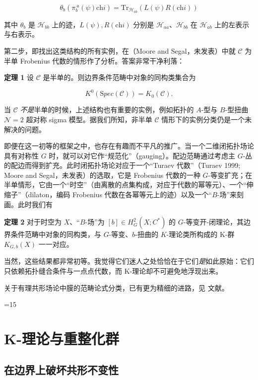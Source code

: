 \documentclass[11pt,a4paper]{ctexart}
\newcommand{\SrcRange}[2]{\ifnum#1=#2\marginpar{\raggedright\footnotesize 原文 p.#1}\else\marginpar{\raggedright\footnotesize 原文 pp.#1--#2}\fi}
\begin{document}
\[\theta_b(\pi_b^{~a}(\psi) \mathrm{ch}i) = {{\mathrm{Tr}}}_{{\mathcal H}_{ab}}\left( L(\psi) R(\mathrm{ch}i)\right)\]

其中 \(\theta_b\) 是 \({\mathcal H}_{bb}\) 上的迹，\(L(\psi),R(\mathrm{ch}i)\) 分别是 \({\mathcal H}_{aa}\)、\({\mathcal H}_{bb}\) 在 \({\mathcal H}_{ab}\) 上的左表示与右表示。

第二步，即找出这类结构的所有实例，在（Moore and Segal，未发表）中就 \({\mathcal C}\) 为半单 Frobenius 代数的情形作了分析。答案非常干净利落：

\textbf{定理 1} 设 \({\mathcal C}\) 是半单的。则边界条件范畴中对象的同构类集合为

\[K^0({\mathrm Spec}({\mathcal C}))= K_0({\mathcal C}) .\]

当 \({\mathcal C}\) \emph{不是}半单的时候，上述结构也有重要的实例，例如拓扑的 \(A\)-型与 \(B\)-型扭曲 \({\mathcal N}=2\) 超对称 sigma 模型。据我们所知，非半单 \({\mathcal C}\) 情形下的实例分类仍是一个未解决的问题。

即便在这一初等的框架之中，也存在有趣而不平凡的推广。当一个二维闭拓扑场论具有对称性 \(G\) 时，就可以对它作``规范化''（gauging）。配边范畴通过考虑主 \(G\)-丛的配边而得到扩充。此时闭拓扑场论对应于一个``Turaev 代数''（Turaev 1999; Moore and Segal，未发表）的选取，它是 Frobenius 代数的一种 \(G\)-等变扩充；在半单情形，它由一个``时空''（由离散的点集构成，对应于代数的幂等元）、一个``伸缩子''（dilaton，编码 Frobenius 代数在各幂等元上的迹）以及一个``\(B\)-场''来刻画。此时我们有

\textbf{定理 2} 对于时空为 \(X\)、``\(B\)-场''为 \([b]\in H^2_G(X;C^*)\) 的 \(G\)-等变开-闭理论，其边界条件范畴中对象的同构类，与 \(G\)-等变、\(b\)-扭曲的 \(K\)-理论类所构成的 K-群 \(K_{G,b}(X)\) 一一对应。

当然，这些结果都非常初等。我觉得它们迷人之处恰恰在于它们\emph{是}如此原始：它们只依赖拓扑缝合条件与一点点代数，而 K-理论却不可避免地浮现出来。

关于有理共形场论中膜的范畴论式分类，已有更为精细的进路，见 文献。

\SrcRange{7}{15}
\section{K-理论与重整化群}\label{k-ux7406ux8bbaux4e0eux91cdux6574ux5316ux7fa4}

\subsection{在边界上破坏共形不变性}\label{ux5728ux8fb9ux754cux4e0aux7834ux574fux5171ux5f62ux4e0dux53d8ux6027}
\end{document}
